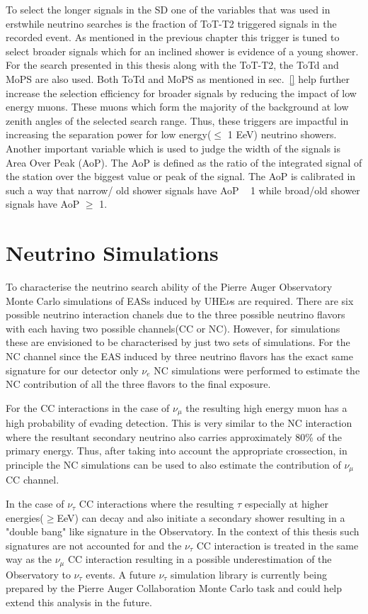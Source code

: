 To select the longer signals in the SD one of the variables that was used in erstwhile neutrino searches is the fraction of ToT-T2 triggered signals in the recorded event. As mentioned in the previous chapter this trigger is tuned to select broader signals which for an inclined shower is evidence of a young shower. For the search presented in this thesis along with the ToT-T2, the ToTd and MoPS are also used. Both ToTd and MoPS as mentioned in sec.~\ref{} help further increase the selection efficiency for broader signals by reducing the impact of low energy muons. These muons which form the majority of the background at low zenith angles of the selected search range. Thus, these triggers are impactful in increasing the separation power for low energy($\leq$ 1 EeV) neutrino showers. Another important variable which is used to judge the width of the signals is Area Over Peak (AoP). The AoP is defined as the ratio of the integrated signal of the station over the biggest value or peak of the signal. The AoP is calibrated in such a way that narrow/ old shower signals have AoP ~ 1 while broad/old shower signals have AoP $\geqslant $ 1. 



\section{Neutrino Simulations}
\label{sec:sim_DGL}
To characterise the neutrino search ability of the Pierre Auger Observatory Monte Carlo simulations of EASs induced by UHE$\nu$s are required. There are six possible neutrino interaction chanels due to the three possible neutrino flavors with each having two possible channels(CC or NC). However, for simulations these are envisioned to be characterised by just two sets of simulations. For the NC channel since the EAS induced by three neutrino flavors has the exact same signature for our detector only $\nu_e$ NC simulations were performed to estimate the NC contribution of all the three flavors to the final exposure. 

For the CC interactions in the case of $\nu_{\mu}$ the resulting high energy muon has a high probability of evading detection. This is very similar to the NC interaction where the resultant secondary neutrino also carries approximately 80\% of the primary energy. Thus, after taking into account the appropriate crossection, in principle the NC simulations can be used to also estimate the contribution of $\nu_{\mu}$ CC channel.  

In the case of $\nu_{\tau}$ CC interactions where the resulting $\tau$ especially at higher energies($\geq $EeV) can decay and also initiate a secondary shower resulting in a "double bang" like signature in the Observatory. In the context of this thesis such signatures are not accounted for and the $\nu_{\tau}$ CC interaction is treated in the same way as the $\nu_{\mu}$ CC interaction resulting in a possible underestimation of the Observatory to $\nu_{\tau}$ events. A future $\nu_{\tau}$ simulation library is currently being prepared by the Pierre Auger Collaboration Monte Carlo task and could help extend this analysis in the future.

